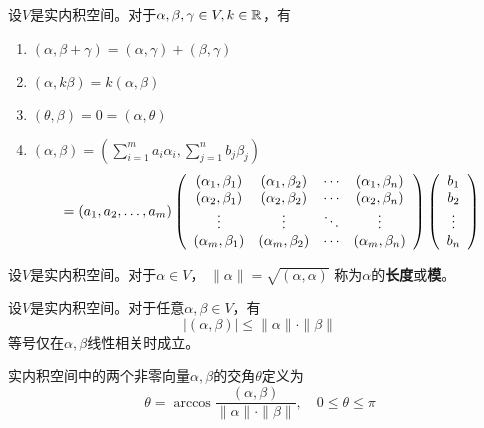 \begin{theorem}[实内积空间的性质] \label{thrm-real-inner-prod-space-prop}
  设$V$是实内积空间。对于$\alpha,\beta,\gamma\in V, k\in\mfR$，有
  \begin{enumerate}
    \item \label{thrm-RIPS-prop1}
    $(\alpha,\beta+\gamma)=(\alpha,\gamma)+(\beta,\gamma)$
    \item
    $(\alpha,k\beta)=k(\alpha,\beta)$
    \item
    $(\theta,\beta)=0=(\alpha,\theta)$
    \item
    $(\alpha,\beta)=
      \left(\sum_{i=1}^{m}a_i\alpha_i,\sum_{j=1}^{n}b_j\beta_j\right) $
    \begin{equation} \label{eq-metric-mat}
      = (a_1,a_2,\dots,a_m) \mmat{cccc}{
        (\alpha_1,\beta_1)&(\alpha_1,\beta_2)&\cdots&(\alpha_1,\beta_n)\\
        (\alpha_2,\beta_1)&(\alpha_2,\beta_2)&\cdots&(\alpha_2,\beta_n)\\
        \vdots            &\vdots            &\ddots&\vdots            \\
        (\alpha_m,\beta_1)&(\alpha_m,\beta_2)&\cdots&(\alpha_m,\beta_n)}
        \mmat{c}{b_1 \\ b_2 \\ \vdots \\ b_n}
    \end{equation}
  \end{enumerate}
\end{theorem}

\begin{definition}[长度]
  设$V$是实内积空间。对于$\alpha\in V$，
  $\| \alpha \| = \sqrt{(\alpha,\alpha)}$
  称为$\alpha$的\textbf{长度}或\textbf{模}。
\end{definition}

\begin{theorem}
  设$V$是实内积空间。对于任意$\alpha,\beta\in V$，有
  \begin{displaymath}
    |(\alpha,\beta)| \le \|\alpha\|\cdot\|\beta\|
  \end{displaymath}
  等号仅在$\alpha,\beta$线性相关时成立。
\end{theorem}

\begin{definition}[交角]
  实内积空间中的两个非零向量$\alpha,\beta$的交角$\theta$定义为
  \begin{displaymath}
    \theta = \arccos\frac{(\alpha,\beta)}{\|\alpha\|\cdot\|\beta\|},
    \quad  0\le\theta\le\pi
  \end{displaymath}
\end{definition}

